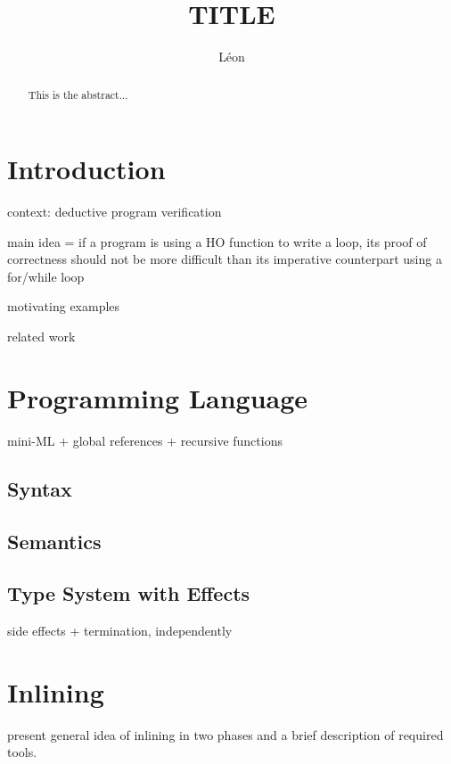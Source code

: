\documentclass[a4paper,11pt,oneside]{article}
\title{TITLE}
\author{Léon}
\theoremstyle{plain}
\begin{document}
\maketitle

\tableofcontents

\begin{abstract}
  This is the abstract...
\end{abstract}

\section{Introduction}

context: deductive program verification~\cite{filliatre11sttt}

main idea = if a program is using a HO function to write a loop, its
proof of correctness should not be more difficult than its imperative
counterpart using a for/while loop

motivating examples

related work 

\section{Programming Language}

mini-ML + global references + recursive functions

\subsection{Syntax}

\subsection{Semantics}

\subsection{Type System with Effects}

side effects + termination, independently
\newpage
\section{Inlining}

	present general idea of inlining in two phases and a brief description of 
	required tools.
	
\end{document}
